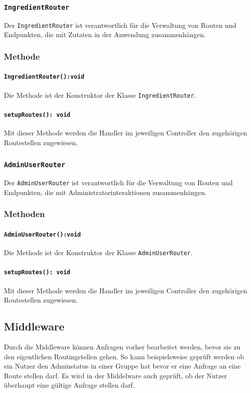 \documentclass{entwurfsheft}
\begin{document}
\subsubsection{\texttt{IngredientRouter}}\label{sec:IngredientRouter}
Der \texttt{IngredientRouter} ist verantwortlich für die Verwaltung von Routen und Endpunkten, die mit Zutaten in der Anwendung zusammenhängen.
\subsubsection*{Methode}
\paragraph{\texttt{IngredientRouter():void}}
Die Methode ist der Konstruktor der Klasse \texttt{IngredientRouter}.
\paragraph{\texttt{setupRoutes(): void}}
Mit dieser Methode werden die Handler im jeweiligen Controller den zugehörigen Routestellen zugewiesen.

\subsubsection{\texttt{AdminUserRouter}}\label{sec:AdminUserRouter}
Der \texttt{AdminUserRouter} ist verantwortlich für die Verwaltung von Routen und Endpunkten, die mit Administratorinteraktionen zusammenhängen.
\subsubsection*{Methoden}
\paragraph{\texttt{AdminUserRouter():void}}
Die Methode ist der Konstruktor der Klasse \texttt{AdminUserRouter}.
\paragraph{\texttt{setupRoutes(): void}}
Mit dieser Methode werden die Handler im jeweiligen Controller den zugehörigen Routestellen zugewiesen.

\newpage

\subsection{Middleware}
Durch die Middleware können Anfragen vorher bearbeitet werden, bevor sie zu den eigentlichen Routingstellen gehen.
So kann beispielsweise geprüft werden ob ein Nutzer den Adminstatus in einer Gruppe hat bevor er eine Anfrage an eine Route stellen darf.
Es wird in der Middelware auch geprüft, ob der Nutzer überhaupt eine gültige Anfrage stellen darf.
\end{document}
